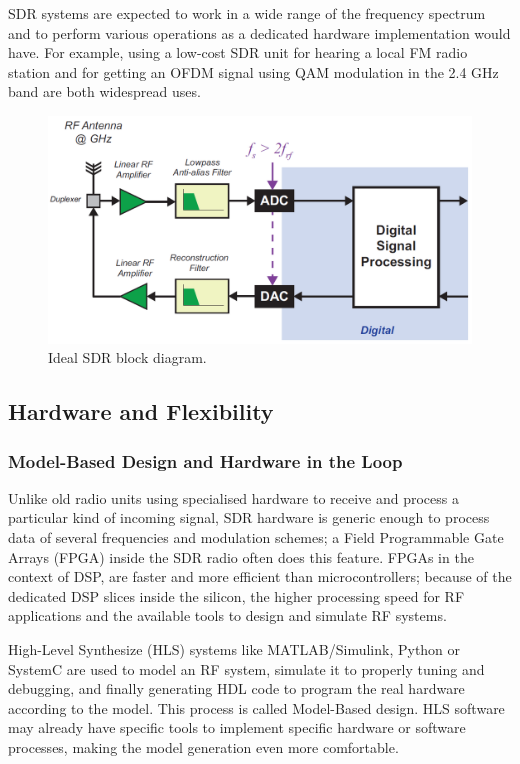 \documentclass[12pt,a4paper]{report}
\begin{document}
SDR systems are expected to work in a wide range of the frequency spectrum and to perform various operations as a dedicated hardware implementation would have. For example, using a low-cost SDR unit for hearing a local FM radio station and for getting an OFDM signal using QAM modulation in the 2.4 GHz band are both widespread uses.

\begin{figure}[h]
    \centering
    \includegraphics[scale=0.7]{Figures/SDR_Ideal.png}
    \caption[Ideal SDR block diagram.]{Ideal SDR block diagram. \cite{Stewart}}
    \label{fig:SDR_Ideal}
\end{figure}

\subsection{Hardware and Flexibility} \label{back:sdr:hdwr}
\subsubsection{Model-Based Design and Hardware in the Loop} \label{back:sdr:hdwr:mbd}
Unlike old radio units using specialised hardware to receive and process a particular kind of incoming signal, SDR hardware is generic enough to process data of several frequencies and modulation schemes; a Field Programmable Gate Arrays (FPGA) inside the SDR radio often does this feature. FPGAs in the context of DSP, are faster and more efficient than microcontrollers; because of the dedicated DSP slices inside the silicon, the higher processing speed for RF applications and the available tools to design and simulate RF systems.

High-Level Synthesize (HLS) systems like MATLAB/Simulink, Python or SystemC are used to model an RF system, simulate it to properly tuning and debugging, and finally generating HDL code to program the real hardware according to the model. This process is called Model-Based design. HLS software may already have specific tools to implement specific hardware or software processes, making the model generation even more comfortable. 
\end{document}

